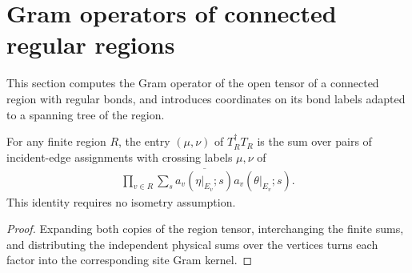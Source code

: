 \section{Gram operators of connected regular regions}%
\label{sec:peps_regular_region_gram}

This section computes the Gram operator of the open tensor of a connected
region with regular bonds, and introduces coordinates on its bond labels
adapted to a spanning tree of the region.

\begin{lemma}%
    \label{thm:peps_open_region_gram_expansion}
    \leanok
    For any finite region $R$, the entry $(\mu,\nu)$ of
    $T_R^\dagger T_R$ is the sum over pairs of incident-edge assignments
    with crossing labels $\mu,\nu$ of
    \begin{align}
        \prod_{v\in R}\sum_s
        \overline{a_v(\eta|_{E_v};s)}a_v(\theta|_{E_v};s).
    \end{align}
    This identity requires no isometry assumption.
\end{lemma}
\begin{proof}\leanok
    Expanding both copies of the region tensor, interchanging the finite
    sums, and distributing the independent physical sums over the
    vertices turns each factor into the corresponding site Gram kernel.
\end{proof}

